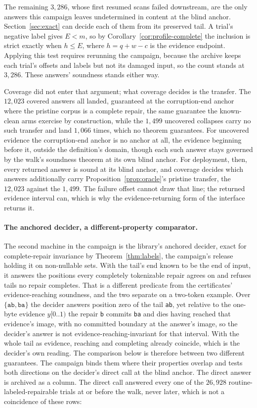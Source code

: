 \documentclass[11pt,a4paper]{article}
\theoremstyle{definition}
\theoremstyle{plain}
\theoremstyle{remark}
\newcommand{\code}[1]{\texttt{#1}}
\newcommand{\window}[3]{#1[#2..#3)}
\begin{document}
The remaining $3{,}286$, whose first resumed scans failed downstream, are the only answers this campaign leaves
undetermined in content at the blind anchor. Section~\ref{sec:exact} can decide each of them from its preserved tail. A
trial's negative label gives $E < m$, so by Corollary~\ref{cor:profile-complete} the inclusion is strict exactly when
$h \le E$, where $h = q + w - c$ is the evidence endpoint. Applying this test requires rerunning the campaign, because
the archive keeps each trial's offsets and labels but not its damaged input, so the count stands at $3{,}286$. These
answers' soundness stands either way.

Coverage did not enter that argument; what coverage decides is the transfer. The $12{,}023$ covered answers all landed,
guaranteed at the corruption-end anchor where the pristine corpus is a complete repair, the same guarantee the
known-clean arms exercise by construction, while the $1{,}499$ uncovered collapses carry no such transfer and land
$1{,}066$ times, which no theorem guarantees. For uncovered evidence the corruption-end anchor is no anchor at all, the
evidence beginning before it, outside the definition's domain, though each such answer stays governed by the walk's
soundness theorem at its own blind anchor. For deployment, then, every returned answer is sound at its blind anchor, and
coverage decides which answers additionally carry Proposition~\ref{prop:oracle}'s pristine transfer, the $12{,}023$
against the $1{,}499$. The failure offset cannot draw that line; the returned evidence interval can, which is why the
evidence-returning form of the interface returns it.

\paragraph{The anchored decider, a different-property comparator.} The second machine in the campaign is the library's
anchored decider, exact for complete-repair invariance by Theorem~\ref{thm:labels}, the campaign's release holding it on
non-nullable sets. With the tail's end known to be the end of input, it answers the positions every completely
tokenizable repair agrees on and refuses tails no repair completes. That is a different predicate from the certificates'
evidence-reaching soundness, and the two separate on a two-token example. Over $\{\code{ab}, \code{ba}\}$ the decider
answers position zero of the tail \code{ab}, yet relative to the one-byte evidence $\window{y}{0}{1}$ the repair
\code{b} commits \code{ba} and dies having reached that evidence's image, with no committed boundary at the answer's
image, so the decider's answer is not evidence-reaching-invariant for that interval. With the whole tail as evidence,
reaching and completing already coincide, which is the decider's own reading. The comparison below is therefore between
two different guarantees. The campaign binds them where their properties overlap and tests both directions on the
decider's direct call at the blind anchor. The direct answer is archived as a column. The direct call answered every one
of the $26{,}928$ routine-labeled-repairable trials at or before the walk, never later, which is not a coincidence of
these rows:
\end{document}
